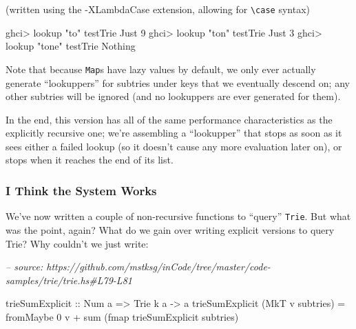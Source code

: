 \documentclass[]{article}
\newenvironment{Shaded}{}{}
\newcommand{\CommentTok}[1]{\textcolor[rgb]{0.38,0.63,0.69}{\textit{#1}}}
\newcommand{\DataTypeTok}[1]{\textcolor[rgb]{0.56,0.13,0.00}{#1}}
\newcommand{\DecValTok}[1]{\textcolor[rgb]{0.25,0.63,0.44}{#1}}
\newcommand{\FunctionTok}[1]{\textcolor[rgb]{0.02,0.16,0.49}{#1}}
\newcommand{\NormalTok}[1]{#1}
\newcommand{\OtherTok}[1]{\textcolor[rgb]{0.00,0.44,0.13}{#1}}
\newcommand{\StringTok}[1]{\textcolor[rgb]{0.25,0.44,0.63}{#1}}
\begin{document}
(written using the -XLambdaCase extension, allowing for
\texttt{\textbackslash{}case} syntax)

\begin{Shaded}
\begin{Highlighting}[]
\NormalTok{ghci}\FunctionTok{>}\NormalTok{ lookup }\StringTok{"to"}\NormalTok{ testTrie}
\DataTypeTok{Just} \DecValTok{9}
\NormalTok{ghci}\FunctionTok{>}\NormalTok{ lookup }\StringTok{"ton"}\NormalTok{ testTrie}
\DataTypeTok{Just} \DecValTok{3}
\NormalTok{ghci}\FunctionTok{>}\NormalTok{ lookup }\StringTok{"tone"}\NormalTok{ testTrie}
\DataTypeTok{Nothing}
\end{Highlighting}
\end{Shaded}

Note that because \texttt{Map}s have lazy values by default, we only ever
actually generate ``lookuppers'' for subtries under keys that we eventually
descend on; any other subtries will be ignored (and no lookuppers are ever
generated for them).

In the end, this version has all of the same performance characteristics as the
explicitly recursive one; we're assembling a ``lookupper'' that stops as soon as
it sees either a failed lookup (so it doesn't cause any more evaluation later
on), or stops when it reaches the end of its list.

\hypertarget{i-think-the-system-works}{%
\subsubsection{I Think the System Works}\label{i-think-the-system-works}}

We've now written a couple of non-recursive functions to ``query''
\texttt{Trie}. But what was the point, again? What do we gain over writing
explicit versions to query Trie? Why couldn't we just write:

\begin{Shaded}
\begin{Highlighting}[]
\CommentTok{-- source: https://github.com/mstksg/inCode/tree/master/code-samples/trie/trie.hs#L79-L81}

\OtherTok{trieSumExplicit ::} \DataTypeTok{Num}\NormalTok{ a }\OtherTok{=>} \DataTypeTok{Trie}\NormalTok{ k a }\OtherTok{->}\NormalTok{ a}
\NormalTok{trieSumExplicit (}\DataTypeTok{MkT}\NormalTok{ v subtries) }\FunctionTok{=}
\NormalTok{    fromMaybe }\DecValTok{0}\NormalTok{ v }\FunctionTok{+}\NormalTok{ sum (fmap trieSumExplicit subtries)}
\end{Highlighting}
\end{Shaded}
\end{document}
